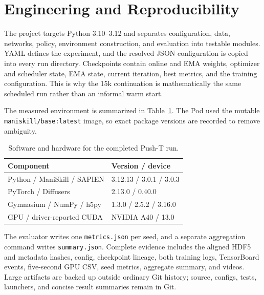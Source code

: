 \section{Engineering and Reproducibility}

The project targets Python 3.10--3.12 and separates configuration, data, networks, policy,
environment construction, and evaluation into testable modules. YAML defines the experiment, and
the resolved JSON configuration is copied into every run directory. Checkpoints contain online and
EMA weights, optimizer and scheduler state, EMA state, current iteration, best metrics, and the
training configuration. This is why the 15k continuation is mathematically the same scheduled run
rather than an informal warm start.

The measured environment is summarized in Table~\ref{tab:software}. The Pod used the mutable
\texttt{maniskill/base:latest} image, so exact package versions are recorded to remove ambiguity.

\begin{table}[t]
    \centering
    \caption{Software and hardware for the completed Push-T run.}
    \label{tab:software}
    \footnotesize
    \begin{tabular}{@{}ll@{}}
        \toprule
        Component & Version / device \\
        \midrule
        Python / ManiSkill / SAPIEN & 3.12.13 / 3.0.1 / 3.0.3 \\
        PyTorch / Diffusers & 2.13.0 / 0.40.0 \\
        Gymnasium / NumPy / h5py & 1.3.0 / 2.5.2 / 3.16.0 \\
        GPU / driver-reported CUDA & NVIDIA A40 / 13.0 \\
        \bottomrule
    \end{tabular}
\end{table}

The evaluator writes one \texttt{metrics.json} per seed, and a separate aggregation command writes
\texttt{summary.json}. Complete evidence includes the aligned HDF5 and metadata hashes, config,
checkpoint lineage, both training logs, TensorBoard events, five-second GPU CSV, seed metrics,
aggregate summary, and videos. Large artifacts are backed up outside ordinary Git history; source,
configs, tests, launchers, and concise result summaries remain in Git.

